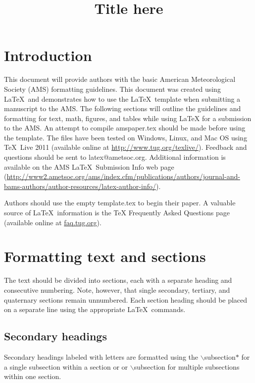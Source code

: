 \documentclass{ametsoc}
\title{Title here}
\affiliation{American Meteorological Society, 
     Boston, Massachusetts}
\begin{document}
\maketitle


%
\section{Introduction}

This document will provide authors with the basic American Meteorological
Society (AMS) formatting guidelines. This document was created using \LaTeX\
and demonstrates how to use the \LaTeX\ template when submitting a manuscript
to the AMS.  The following sections will outline the guidelines and
formatting for text, math, figures, and tables while using \LaTeX\/ for a
submission to the AMS. An attempt to compile amspaper.tex should be made
before using the template. The files have been tested on Windows, Linux, and
Mac OS using \TeX\ Live 2011 (available online at
\url{http://www.tug.org/texlive/}). Feedback and questions should be sent to
latex@ametsoc.org. Additional information is available on the AMS \LaTeX\ Submission Info
web page (\url{http://www2.ametsoc.org/ams/index.cfm/publications/authors/journal-and-bams-authors/author-resources/latex-author-info/}).

Authors should use the empty template.tex to begin their
paper. A valuable source of \LaTeX\ information is the {TeX
Frequently Asked Questions} page (available online at \url{faq.tug.org}).

\section{Formatting text and sections}
The text should be divided into sections, each with a separate heading and
consecutive numbering. Note, however, that single secondary, tertiary, and
quaternary sections remain unnumbered. Each section heading should be placed
on a separate line using the appropriate \LaTeX\ commands. 

\subsection*{Secondary headings} 
Secondary headings labeled with letters are formatted using the
$\backslash$subsection$*${\tt\string{\string}} for a single
subsection within a section or
 or $\backslash$subsection{\tt\string{\string}} 
for multiple
subsections within one section.
\end{document}

